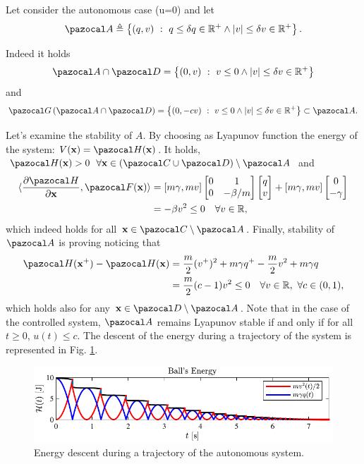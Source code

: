 \begin{exmp}
Let consider the autonomous case (u=0) and let 
%
\begin{equation}
    \A\triangleq \left\{(q,v)~:~q\leq\delta q\in\R^+\land |v|\leq\delta v\in\R^+\right\}.
\end{equation}
%

Indeed it holds 
%
\begin{equation}
    \A\cap\D = \left\{(0,v)~:~v\leq 0\land |v|\leq\delta v\in\R^+\right\}
\end{equation}
%
and
%
\begin{equation}
    \G\left(\A\cap\D\right) = \left\{(0,-cv)~:~v\leq 0\land |v|\leq\delta v\in\R^+\right\}\subset \A.
\end{equation}
%

Let's examine the stability of $A$. By choosing as Lyapunov function the energy of the system: $V(\xb) = \Ha(\xb)$. It holds, $\Ha(\xb)>0~~\forall \xb\in\left(\C\cup\D\right)\setminus\A$ and
%
\begin{align}
    \langle\frac{\partial\Ha}{\partial \xb},\F(\x)\rangle &= [m\gamma,mv]\begin{bmatrix}0&1\\0&-\beta/m\end{bmatrix}\begin{bmatrix}q\\v\end{bmatrix} + [m\gamma,mv] \begin{bmatrix}0\\-\gamma\end{bmatrix} \\
    & = -\beta v^2 \leq 0\quad\forall v\in\R,
\end{align}
%
which indeed holds for all $\xb\in\C\setminus\A$.
%
Finally, stability of $\A$ is proving noticing that
%
\begin{align}
    \Ha(\x^+) -\Ha(\xb) &= \frac{m}{2}(v^+)^2 + m\gamma q^+ - \frac{m}{2}v^2 + m\gamma q\\
    &= \frac{m}{2}(c-1)v^2\leq 0 \quad\forall v\in\R,~\forall c\in(0,1),
\end{align}
%
which holds also for any $\xb\in\D\setminus\A$. Note that in the case of the controlled system, $\A$ remains Lyapunov stable if and only if for all $t\geq 0$, $u(t)\leq c$. The descent of the energy during a trajectory of the system is represented in Fig. \ref{fig:bb2}.
%
\begin{figure}[!h]
    \centering
    \includegraphics{Figures/bb2.pdf}
    \caption{Energy descent during a trajectory of the autonomous system.}
    \label{fig:bb2}
\end{figure}
%
\end{exmp}
%
%
\clearpage